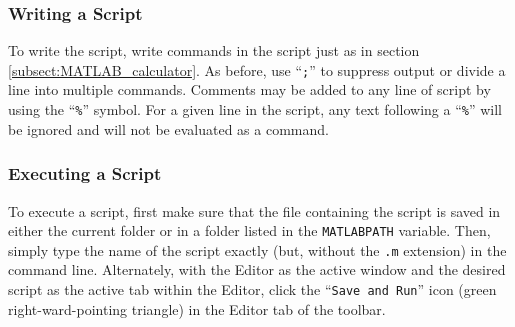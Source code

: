\subsubsection{Writing a Script}
To write the script, write commands in the script just as in section \ref{subsect:MATLAB_calculator}. As before, use ``\texttt{;}'' to suppress output or divide a line into multiple commands. Comments may be added to any line of script by using the ``\texttt{\%}'' symbol. For a given line in the script, any text following a ``\texttt{\%}'' will be ignored and will not be evaluated as a command.

\subsubsection{Executing a Script}
To execute a script, first make sure that the file containing the script is saved in either the current folder or in a folder listed in the \texttt{MATLABPATH} variable. Then, simply type the name of the script exactly (but, without the \texttt{.m} extension) in the command line. Alternately, with the Editor as the active window and the desired script as the active tab within the Editor, click the ``\texttt{Save and Run}'' icon (green right-ward-pointing triangle) in the Editor tab of the toolbar.
